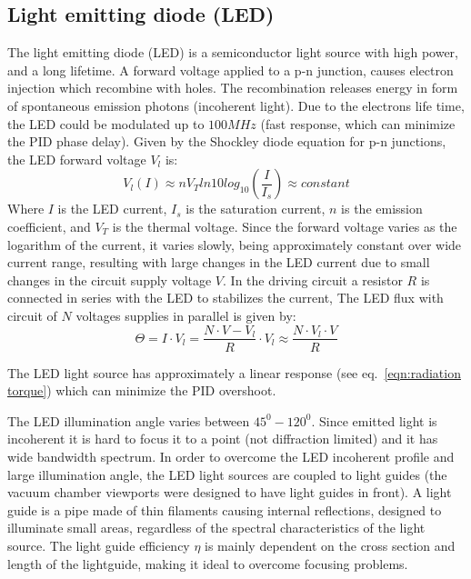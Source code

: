 \documentclass[\main/master.tex]{subfiles}
\begin{document}
\subsection{Light emitting diode (LED)}
The light emitting diode (LED) is a semiconductor light source with high power, and a long lifetime. A forward voltage applied to a p-n junction, causes electron injection which recombine with holes. The recombination releases energy in form of spontaneous emission photons (incoherent light). Due to the electrons life time, the LED could be modulated up to $100MHz$ (fast response, which can minimize the PID phase delay). Given by the Shockley diode equation for p-n junctions, the LED forward voltage $V_l$ is:
\begin{equation}
V_l(I) \approx n V_T ln10 log_{10} (\frac{I}{I_s})\approx constant \label{eqn:led voltage}
\end{equation}
Where $I$ is the LED current, $I_s$ is the saturation current, $n$ is the emission coefficient, and $V_T$ is the thermal voltage. Since the forward voltage varies as the logarithm of the current, it varies slowly, being approximately constant over wide current range, resulting with large changes in the LED current due to small changes in the circuit supply voltage $V$. In the driving circuit a resistor $R$ is connected in series with the LED to stabilizes the current, The LED flux with circuit of $N$ voltages supplies in parallel is given by:
\begin{equation}
\Theta = I\cdot V_l  =\frac{N\cdot V-V_l}{R}\cdot V_l\approx \frac{N\cdot V_l\cdot V}{R}\label{eqn:led power}
\end{equation}
\par\noindent
The LED light source has approximately a linear response (see eq.~\ref{eqn:radiation torque}) which can minimize the PID overshoot.
\par\noindent
The LED illumination angle varies between $45^0-120^0$. Since emitted light is incoherent it is hard to focus it to a point (not diffraction limited) and it has wide bandwidth spectrum. In order to overcome the LED incoherent profile and large illumination angle, the LED light sources are coupled to light guides (the vacuum chamber viewports were designed to have light guides in front). A light guide is a pipe made of thin filaments causing internal reflections, designed to illuminate small areas, regardless of the spectral characteristics of the light source. The light guide efficiency $\eta$ is mainly dependent on the cross section and length of the lightguide, making it ideal to overcome focusing problems. 
\end{document}

